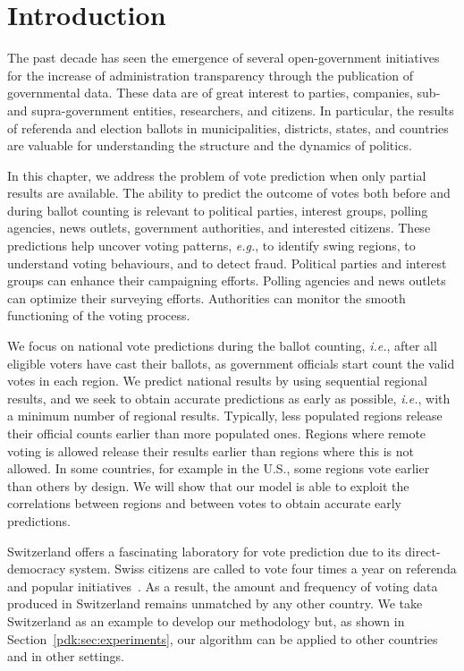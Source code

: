 \section{Introduction}%
\label{pdk:sec:introduction}

The past decade has seen the emergence of several open-government initiatives for the increase of administration transparency through the publication of governmental data.
These data are of great interest to parties, companies, sub- and supra-government entities, researchers, and citizens.
In particular, the results of referenda and election ballots in municipalities, districts, states, and countries are valuable for understanding the structure and the dynamics of politics.

In this chapter, we address the problem of vote prediction when only partial results are available.
The ability to predict the outcome of votes both before and during ballot counting is relevant to political parties, interest groups, polling agencies, news outlets, government authorities, and interested citizens.
These predictions help uncover voting patterns, \textit{e.g.}, to identify swing regions, to understand voting behaviours, and to detect fraud.
Political parties and interest groups can enhance their campaigning efforts.
Polling agencies and news outlets can optimize their surveying efforts.
Authorities can monitor the smooth functioning of the voting process.

We focus on national vote predictions during the ballot counting, \textit{i.e.}, after all eligible voters have cast their ballots, as government officials start count the valid votes in each region.
We predict national results by using sequential regional results, and we seek to obtain accurate predictions as early as possible, \textit{i.e.}, with a minimum number of regional results.
Typically, less populated regions release their official counts earlier than more populated ones.
Regions where remote voting is allowed release their results earlier than regions where this is not allowed.
In some countries, for example in the U.S., some regions vote earlier than others by design.
We will show that our model is able to exploit the correlations between regions and between votes to obtain accurate early predictions.

Switzerland offers a fascinating laboratory for vote prediction due to its direct-democracy system.
Swiss citizens are called to vote four times a year on referenda and popular initiatives~\citep{confederation2019democracy, confederation2019popular}.
As a result, the amount and frequency of voting data produced in Switzerland remains unmatched by any other country.
We take Switzerland as an example to develop our methodology but, as shown in Section~\ref{pdk:sec:experiments}, our algorithm can be applied to other countries and in other settings.

